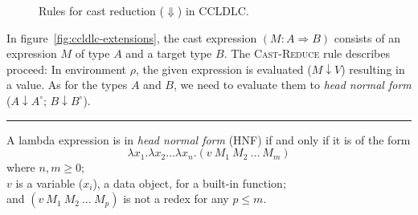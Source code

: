 \begin{figure}
\caption{Rules for cast reduction ($\Downarrow$) in CCLDLC.}
\label{fig:cast-reduction-rules}
\end{figure}

In figure~\ref{fig:ccldlc-extensions}, the cast expression $(M : A \Rightarrow B)$ consists of an expression $M$ of type $A$ and a target type $B$. The \textsc{Cast-Reduce} rule describes proceed: In environment $\rho$, the given expression is evaluated ($M \downarrow V$) resulting in a value. As for the types $A$ and $B$, we need to evaluate them to \emph{head normal form} ($A \downarrow A^\circ$; $B \downarrow B^\circ$).

\vspace{4ex}\hrule

\renewcommand{\mkcitation}[1]{\\--- #1}
\begin{displayquote}
A lambda expression is in \emph{head normal form} (HNF) if and only if it is of the form
\begin{equation*}
\lambda x_1 . \lambda x_2 \dots \lambda x_n . (v~M_1~M_2~\dots~M_m)
\end{equation*}
where $n, m \geq 0$; \\
\hspace*{11mm}$v$ is a variable ($x_i$), a data object, for a built-in function; \\
and \hspace*{2mm} $(v~M_1~M_2~\dots~M_p)$ is not a redex for any $p \leq m$.
\end{displayquote}

